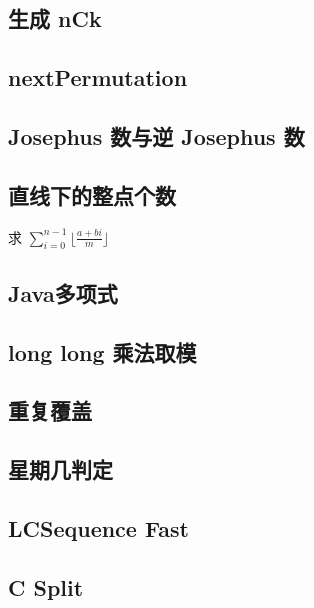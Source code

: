 \documentclass[landscape, twocolumn, 8pt, a4paper, twoside]{extarticle}
\begin{document}
\subsection{生成 nCk}


\subsection{nextPermutation}


\subsection{Josephus 数与逆 Josephus 数}


\subsection{直线下的整点个数}
求 $\sum_{i=0}^{n-1} \lfloor\frac{a+bi}{m}\rfloor$


\subsection{Java多项式}


\subsection{long long 乘法取模}


\subsection{重复覆盖}


\subsection{星期几判定}


\subsection{LCSequence Fast}


\subsection{C Split}

\end{document}
